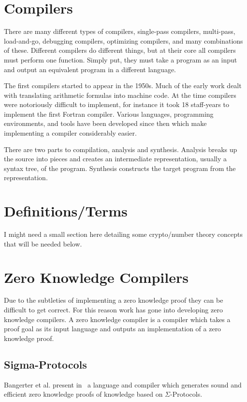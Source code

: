 \documentclass{sig-alternate}
\begin{document}
\section{Compilers}
	There are many different types of compilers, single-pass compilers, multi-pass,
	load-and-go, debugging compilers, optimizing compilers, and many combinations
	of these. Different compilers do different things, but at their core all 
	compilers must perform one function. Simply put, they must take a program as 
	an input and output	an equivalent program in a different
	language.~\cite{Compiler:1986} 
	
	The first compilers started to appear in the 1950s. Much of the early work
	dealt with translating arithmetic formulas into machine code. At the time
	compilers were notoriously difficult to implement, for instance it took
	18 staff-years to implement the first Fortran compiler. Various languages,
	programming	environments, and tools have been developed since then which
	make implementing a compiler considerably easier.
	
	There are two parts to compilation, analysis and synthesis. Analysis breaks
	up the source into pieces and creates an intermediate representation, usually
	a syntax tree, of the program. Synthesis constructs the target program from
    the representation.
    
\section{Definitions/Terms}
	I might need a small section here detailing some crypto/number theory
	concepts that will be needed below.
    
    

\section{Zero Knowledge Compilers}
	Due to the subtleties of implementing a zero knowledge proof they
	can be difficult to get correct. For this reason work has gone into
	developing zero knowledge compilers. A zero knowledge compiler is a
	compiler which takes a proof goal as its input language
	and outputs an implementation of a zero knowledge proof.

	\subsection{Sigma-Protocols}
		Bangerter et al. present in~\cite{Sigma:2009} a language and compiler
		which generates sound and efficient zero knowledge proofs of knowledge
		based on $\Sigma$-Protocols.	
	
\end{document}
